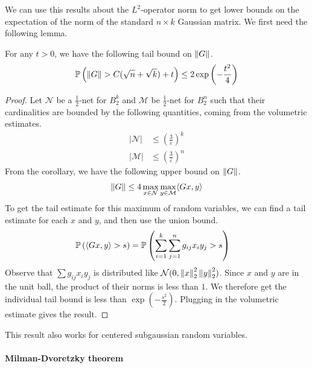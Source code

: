 \documentclass[11pt]{article}
\begin{document}
We can use this results about the $L^2$-operator norm to get lower bounds on the expectation of the norm of the standard $n \times k$ Gaussian matrix.
We first need the following lemma.
\begin{lemma}
  For any $t > 0$, we have the following tail bound on $\norm{G}$.
  \begin{align*}
    \P\left( \norm{G} > C(\sqrt{n} + \sqrt{k}) + t \right) \leq 2 \exp\left( - \frac{t^2}{4} \right)
  \end{align*}
\end{lemma}
\begin{proof}
  Let $\mathcal{N}$ be a $\frac{1}{2}$-net for $B_2^k$ and $\mathcal{M}$ be $\frac{1}{2}$-net for $B_2^n$ such that their cardinalities are bounded by the following quantities, coming from the volumetric estimates.
  \begin{align*}
    |\mathcal{N}| &\leq \left( \frac{3}{\varepsilon} \right)^k \\
    |\mathcal{M}| &\leq \left( \frac{3}{\varepsilon} \right)^n
  \end{align*}
  From the corollary, we have the following upper bound on $\norm{G}$.
  \begin{align*}
    \norm{G} \leq 4 \max_{x \in \mathcal{N}} \max_{y \in \mathcal{M}} \langle Gx, y \rangle
  \end{align*}
  To get the tail estimate for this maximum of random variables, we can find a tail estimate for each $x$ and $y$, and then use the union bound.
  \begin{align*}
    \P\left( \langle Gx, y \rangle > s \right)
    &= \P \left( \sum_{i=1}^k  \sum_{j=1}^n g_{ij} x_i y_j > s\right)
  \end{align*}
  Observe that $\sum g_{ij} x_i y_j$ is distributed like $\mathcal{N}(0, \norm{x}_2^2 \norm{y}_2^2)$.
  Since $x$ and $y$ are in the unit ball, the product of their norms is less than $1$.
  We therefore get the individual tail bound is less than $\exp\left( - \frac{s^2}{2} \right)$.
  Plugging in the volumetric estimate gives the result.
\end{proof}
\begin{remark}
  This result also works for centered subgaussian random variables.
\end{remark}

\paragraph{Milman-Dvoretzky theorem}
\end{document}
